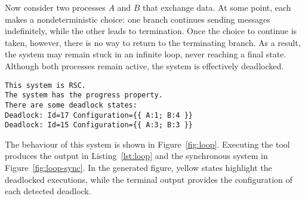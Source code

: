\begin{example}\label{exm:loop}
Now consider two processes $A$ and $B$ that exchange data. At some
point, each makes a nondeterministic choice: one branch continues
sending messages indefinitely, while the other leads to termination.
Once the choice to continue is taken, however, there is no way to
return to the terminating branch. As a result, the system may remain
stuck in an infinite loop, never reaching a final state. Although both
processes remain active, the system is effectively deadlocked.

\begin{lstlisting}[language={},caption={Output of Example~\ref{exm:loop}.},
    label={lst:loop}]
This system is RSC.
The system has the progress property.
There are some deadlock states:
Deadlock: Id=17 Configuration={{ A:1; B:4 }}
Deadlock: Id=15 Configuration={{ A:3; B:3 }}
\end{lstlisting}

The behaviour of this system is shown in Figure~\ref{fig:loop}. 
Executing the tool produces the output in
Listing~\ref{lst:loop} and the synchronous system in
Figure~\ref{fig:loop-sync}. In the
generated figure, yellow states highlight the deadlocked executions,
while the terminal output provides the configuration of each detected
deadlock.



\end{example}
